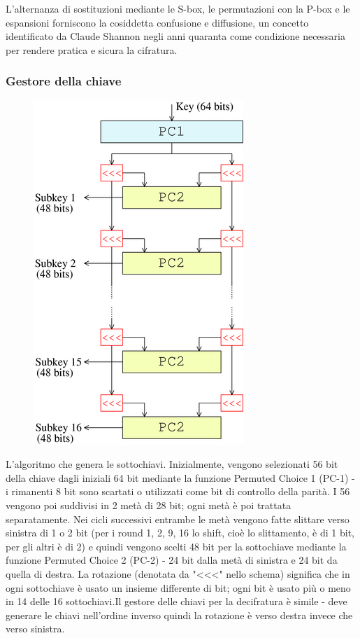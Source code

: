 \documentclass[10pt,a4paper]{article}
\begin{document}
L'alternanza di sostituzioni mediante le S-box, le permutazioni con la P-box e le espansioni forniscono la cosiddetta confusione e diffusione, un concetto identificato da Claude Shannon negli anni quaranta come condizione necessaria per rendere pratica e sicura la cifratura.

\subsubsection{Gestore della chiave}

\begin{figure}[htbp]
\includegraphics[scale=0.6]{immagini/DES_gestore_chiave.png}
\end{figure}

L'algoritmo che genera le sottochiavi. Inizialmente, vengono selezionati 56 bit della chiave dagli iniziali 64 bit mediante la funzione Permuted Choice 1 (PC-1) - i rimanenti 8 bit sono scartati o utilizzati come bit di controllo della parità. I 56 vengono poi suddivisi in 2 metà di 28 bit; ogni metà è poi trattata separatamente. Nei cicli successivi entrambe le metà vengono fatte slittare verso sinistra di 1 o 2 bit (per i round 1, 2, 9, 16 lo shift, cioè lo slittamento, è di 1 bit, per gli altri è di 2) e quindi vengono scelti 48 bit per la sottochiave mediante la funzione Permuted Choice 2 (PC-2) - 24 bit dalla metà di sinistra e 24 bit da quella di destra. La rotazione (denotata da "<<<" nello schema) significa che in ogni sottochiave è usato un insieme differente di bit; ogni bit è usato più o meno in 14 delle 16 sottochiavi.Il gestore delle chiavi per la decifratura è simile - deve generare le chiavi nell'ordine inverso quindi la rotazione è verso destra invece che verso sinistra.
\end{document}
